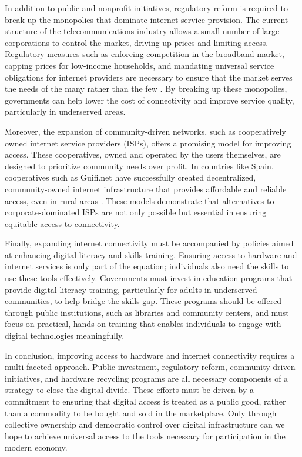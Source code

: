 \begin{refsection}
In addition to public and nonprofit initiatives, regulatory reform is required to break up the monopolies that dominate internet service provision. The current structure of the telecommunications industry allows a small number of large corporations to control the market, driving up prices and limiting access. Regulatory measures such as enforcing competition in the broadband market, capping prices for low-income households, and mandating universal service obligations for internet providers are necessary to ensure that the market serves the needs of the many rather than the few \cite[pp.~101-104]{schillerdigitalcapitalism}. By breaking up these monopolies, governments can help lower the cost of connectivity and improve service quality, particularly in underserved areas.

Moreover, the expansion of community-driven networks, such as cooperatively owned internet service providers (ISPs), offers a promising model for improving access. These cooperatives, owned and operated by the users themselves, are designed to prioritize community needs over profit. In countries like Spain, cooperatives such as Guifi.net have successfully created decentralized, community-owned internet infrastructure that provides affordable and reliable access, even in rural areas \cite[pp.~203-206]{fuchsrole}. These models demonstrate that alternatives to corporate-dominated ISPs are not only possible but essential in ensuring equitable access to connectivity.

Finally, expanding internet connectivity must be accompanied by policies aimed at enhancing digital literacy and skills training. Ensuring access to hardware and internet services is only part of the equation; individuals also need the skills to use these tools effectively. Governments must invest in education programs that provide digital literacy training, particularly for adults in underserved communities, to help bridge the skills gap. These programs should be offered through public institutions, such as libraries and community centers, and must focus on practical, hands-on training that enables individuals to engage with digital technologies meaningfully.

In conclusion, improving access to hardware and internet connectivity requires a multi-faceted approach. Public investment, regulatory reform, community-driven initiatives, and hardware recycling programs are all necessary components of a strategy to close the digital divide. These efforts must be driven by a commitment to ensuring that digital access is treated as a public good, rather than a commodity to be bought and sold in the marketplace. Only through collective ownership and democratic control over digital infrastructure can we hope to achieve universal access to the tools necessary for participation in the modern economy.


\end{refsection}
